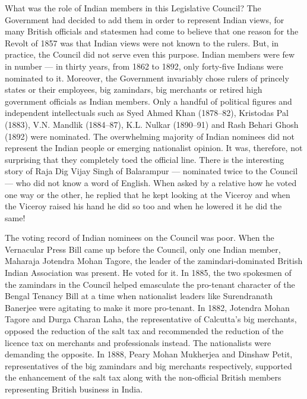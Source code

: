 \begin{multicols}{2}
What was the role of Indian members in this Legislative Council? The Government had decided to add them in order to represent Indian views, for many British officials and statesmen had come to believe that one reason for the Revolt of 1857 was that Indian views were not known to the rulers. But, in practice, the Council did not serve even this purpose. Indian members were few in number --- in thirty years, from 1862 to 1892, only forty-five Indians were nominated to it. Moreover, the Government invariably chose rulers of princely states or their employees, big zamindars, big merchants or retired high government officials as Indian members. Only a handful of political figures and independent intellectuals such as Syed Ahmed Khan (1878--82), Kristodas Pal (1883), V.N. Mandlik (1884--87), K.L. Nulkar (1890--91) and Rash Behari Ghosh (1892) were nominated. The overwhelming majority of Indian nominees did not represent the Indian people or emerging nationalist opinion. It was, therefore, not surprising that they completely toed the official line. There is the interesting story of Raja Dig Vijay Singh of Balarampur --- nominated twice to the Council --- who did not know a word of English. When asked by a relative how he voted one way or the other, he replied that he kept looking at the Viceroy and when the Viceroy raised his hand he did so too and when he lowered it he did the same!

The voting record of Indian nominees on the Council was poor. When the Vernacular Press Bill came up before the Council, only one Indian member, Maharaja Jotendra Mohan Tagore, the leader of the zamindari-dominated British Indian Association was present. He voted for it. In 1885, the two spokesmen of the zamindars in the Council helped emasculate the pro-tenant character of the Bengal Tenancy Bill at a time when nationalist leaders like Surendranath Banerjee were agitating to make it more pro-tenant. In 1882, Jotendra Mohan Tagore and Durga Charan Laha, the representative of Calcutta's big merchants, opposed the reduction of the salt tax and recommended the reduction of the licence tax on merchants and professionals instead. The nationalists were demanding the opposite. In 1888, Peary Mohan Mukherjea and Dinshaw Petit, representatives of the big zamindars and big merchants respectively, supported the enhancement of the salt tax along with the non-official British members representing British business in India.


\end{multicols}
